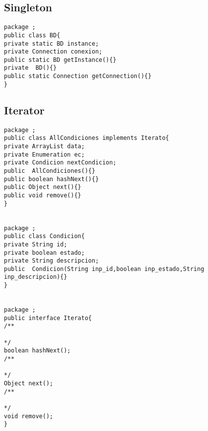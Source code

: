 \newpage
\subsection{Singleton}
\begin{lstlisting}
package ;
public class BD{
private static BD instance;
private Connection conexion;
public static BD getInstance(){}
private  BD(){}
public static Connection getConnection(){}
}
\end{lstlisting}

\newpage
\subsection{Iterator}
\begin{lstlisting}
package ;
public class AllCondiciones implements Iterato{
private ArrayList data;
private Enumeration ec;
private Condicion nextCondicion;
public  AllCondiciones(){}
public boolean hashNext(){}
public Object next(){}
public void remove(){}
}


package ;
public class Condicion{
private String id;
private boolean estado;
private String descripcion;
public  Condicion(String inp_id,boolean inp_estado,String inp_descripcion){}
}


package ;
public interface Iterato{
/**

*/
boolean hashNext();
/**

*/
Object next();
/**

*/
void remove();
}


\end{lstlisting}



\newpage
